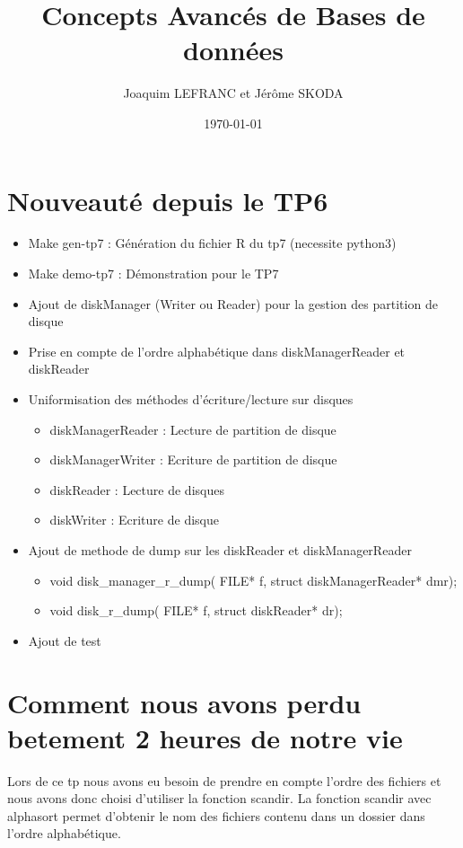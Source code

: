 \documentclass[a4paper]{article}
\title{Concepts Avancés de Bases de données}
\author{Joaquim LEFRANC et Jérôme SKODA}
\date{\today}
\begin{document}
\maketitle


\section{Nouveauté depuis le TP6}

\begin{itemize}
  \item Make gen-tp7 : Génération du fichier R du tp7 (necessite python3)
  \item Make demo-tp7 : Démonstration pour le TP7
  \item Ajout de diskManager (Writer ou Reader) pour la gestion des partition de disque
  \item Prise en compte de l'ordre alphabétique dans diskManagerReader et diskReader
  \item Uniformisation des méthodes d'écriture/lecture sur disques
  \begin{itemize}
    \item diskManagerReader : Lecture de partition de disque
    \item diskManagerWriter : Ecriture de partition de disque
    \item diskReader : Lecture de disques
    \item diskWriter : Ecriture de disque
  \end{itemize}
  \item Ajout de methode de dump sur les diskReader et diskManagerReader
  \begin{itemize}
    \item void disk\_manager\_r\_dump( FILE* f,  struct diskManagerReader* dmr);
    \item void disk\_r\_dump( FILE* f,  struct diskReader* dr);
  \end{itemize}
  \item Ajout de test
\end{itemize}

\section{Comment nous avons perdu betement 2 heures de notre vie}

Lors de ce tp nous avons eu besoin de prendre en compte l'ordre des fichiers
et nous avons donc choisi d'utiliser la fonction scandir.
La fonction scandir avec alphasort permet d'obtenir le nom des fichiers contenu
dans un dossier dans l'ordre alphabétique.
\end{document}
